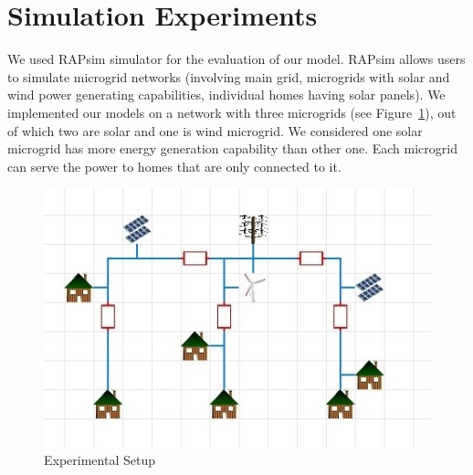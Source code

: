 \section{Simulation Experiments}\label{sec:experiments}
We used  RAPsim  simulator  \cite{rapsim} for the evaluation of our model. RAPsim allows users to simulate microgrid networks (involving main grid, microgrids with solar and wind power generating capabilities, individual homes having solar panels). We implemented our models on a network with three microgrids (see Figure~\ref{exp}), out of which two are solar and one is wind microgrid. We considered one solar microgrid has more energy generation capability than other one. Each microgrid can serve the power to homes that are only connected to it. 


\begin{figure}[thbp]
	\centering
	\includegraphics [scale = 0.6]{experimental_setup.jpg}
        \caption{Experimental Setup}
	\label{exp}
\end{figure}
